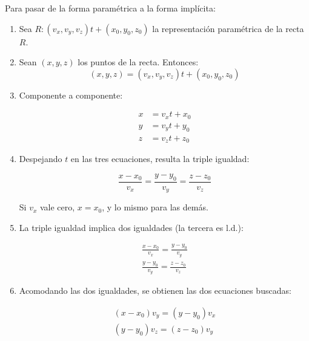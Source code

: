 \documentclass{article}
\begin{document}
Para pasar de la forma paramétrica a la forma implícita:

\begin{enumerate}
\item Sea $R: (v_x, v_y, v_z) t + (x_0, y_0, z_0)$ la representación paramétrica de la recta $R$.

\item Sean $(x,y,z)$ los puntos de la recta. Entonces:
\begin{equation}
(x, y, z) = (v_x, v_y, v_z) t + (x_0, y_0, z_0)
\end{equation}

\item Componente a componente:

\begin{subequations}
\begin{align}
x &= v_x t + x_0 \\
y &= v_y t + y_0 \\
z &= v_z t + z_0
\end{align}
\end{subequations}

\item Despejando $t$ en las tres ecuaciones, resulta la triple igualdad:

\begin{equation}
\frac{x-x_0}{v_x} = \frac{y-y_0}{v_y} = \frac{z-z_0}{v_z}
\end{equation}

Si $v_x$ vale cero, $x = x_0$, y lo mismo para las demás.

\item La triple igualdad implica dos igualdades (la tercera es l.d.):

\begin{subequations}
\begin{align}
\frac{x-x_0}{v_x} = \frac{y-y_0}{v_y} \\
\frac{y-y_0}{v_y} = \frac{z-z_0}{v_z}
\end{align}
\end{subequations}

\item Acomodando las dos igualdades, se obtienen las dos ecuaciones buscadas:

\begin{subequations}
\begin{align}
(x-x_0) v_y = (y-y_0) v_x \\
(y-y_0) v_z = (z-z_0) v_y \\
\end{align}
\end{subequations}

\end{enumerate}
\end{document}
